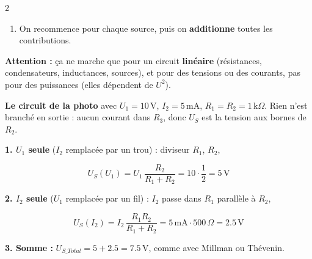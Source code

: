 \documentclass[a4paper,9pt]{extarticle}
\begin{document}
\begin{multicols}{2}
\begin{important}
\begin{enumerate}[leftmargin=*,itemsep=1pt,topsep=1pt]
\item On recommence pour chaque source, puis on \textbf{additionne} toutes les contributions.

\end{enumerate}

\textbf{Attention :} ça ne marche que pour un circuit \textbf{linéaire} (résistances, condensateurs, inductances, sources), et pour des tensions ou des courants, pas pour des puissances (elles dépendent de $U^2$).

\end{important}


\begin{example}

\textbf{Le circuit de la photo} avec $U_1 = 10\,\text{V}$, $I_2 = 5\,\text{mA}$, $R_1 = R_2 = 1\,\text{k}\Omega$. Rien n'est branché en sortie : aucun courant dans $R_3$, donc $U_S$ est la tension aux bornes de $R_2$.

\vspace{3pt}

\textbf{1. $U_1$ seule} ($I_2$ remplacée par un trou) : diviseur $R_1$, $R_2$,

\[
U_S(U_1) = U_1\,\frac{R_2}{R_1 + R_2} = 10 \cdot \frac{1}{2} = 5\,\text{V}
\]

\textbf{2. $I_2$ seule} ($U_1$ remplacée par un fil) : $I_2$ passe dans $R_1$ parallèle à $R_2$,

\[
U_S(I_2) = I_2\,\frac{R_1 R_2}{R_1 + R_2} = 5\,\text{mA} \cdot 500\,\Omega = 2.5\,\text{V}
\]

\textbf{3. Somme :} $U_{S\_Total} = 5 + 2.5 = 7.5\,\text{V}$, comme avec Millman ou Thévenin.

\end{example}


\end{multicols}
\end{document}
